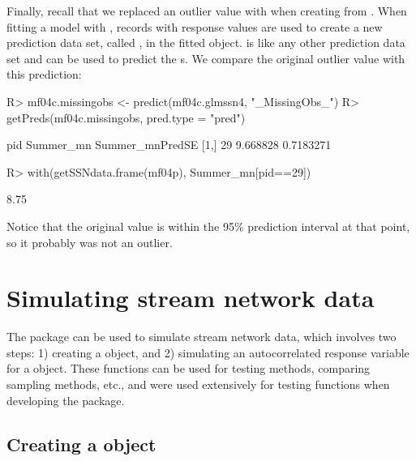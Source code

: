 \documentclass[nojss]{jss}
\renewenvironment{Schunk}{\vspace{\topsep}}{\vspace{\topsep}}
\begin{document}
Finally, recall that we replaced an outlier value with  when
creating  from . When fitting a model with
, records with  response values are used to
create a new prediction data set, called , in the
fitted  object.  is like any other
prediction data set and can be used to predict the s. We
compare the original outlier value with this prediction:

\begin{Schunk}
\begin{Sinput}
R> mf04c.missingobs <- predict(mf04c.glmssn4, "_MissingObs_")
R> getPreds(mf04c.missingobs, pred.type = "pred")
\end{Sinput}
\begin{Soutput}
     pid Summer_mn Summer_mnPredSE
[1,]  29  9.668828       0.7183271
\end{Soutput}
\begin{Sinput}
R> with(getSSNdata.frame(mf04p), Summer_mn[pid==29])
\end{Sinput}
\begin{Soutput}
[1] 8.75
\end{Soutput}
\end{Schunk}

Notice that the original value is within the 95\% prediction
interval at that point, so it probably was not an outlier.

%
%

\section{Simulating stream network data}\label{Simulation}

The  package can be used to simulate stream network data,
which involves two steps: 1) creating a 
object, and 2) simulating an autocorrelated response variable for a
 object. These functions can be used for
testing methods, comparing sampling methods, etc., and were used
extensively for testing functions when developing the 
package.


\subsection[Creating a SpatialStreamNetwork object]{Creating a  object}
\end{document}
